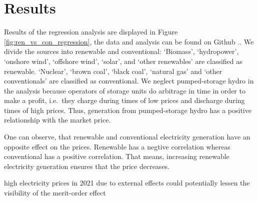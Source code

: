 \documentclass{article}
\begin{document}

\section{Results}
Results of the regression analysis are displayed in Figure \ref{fig:ren_vs_con_regression}, the data and analysis can be found on Github \citep{github_repo}..
We divide the sources into renewable and conventional:
\enquote*{Biomass}, \enquote*{hydropower}, \enquote*{onshore wind}, \enquote*{offshore wind}, \enquote*{solar}, and \enquote*{other renewables} are classified as renewable.
\enquote*{Nuclear}, \enquote*{brown coal}, \enquote*{black coal}, \enquote*{natural gas} and \enquote*{other conventionals} are classified as conventional.
We neglect pumped-storage hydro in the analysis because operators of storage units do arbitrage in time in order to make a profit, i.e.\ they charge during times of low prices and discharge during times of high prices.
Thus, generation from pumped-storage hydro has a positive relationship with the market price.

One can observe, that renewable and conventional electricity generation have an opposite effect on the prices. 
Renewable has a negtive correlation whereas conventional has a positive correlation. 
That means, increasing renewable electricity generation ensures that the price decreases.

high electricity prices in 2021 due to external effects could potentially lessen the visibility of the merit-order effect

\end{document}
